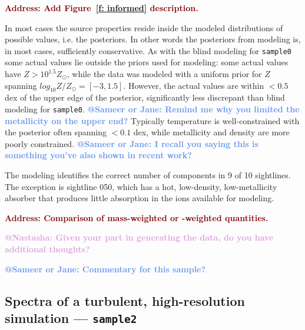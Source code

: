 \documentclass[fleqn,usenatbib]{mnras}
\makeatletter
\newcommand{\todo}[1]{\textcolor{Maroon}{\textbf{Address: #1}}}
\newcommand{\atsameer}[1]{\textcolor{CornflowerBlue}{\textbf{@Sameer or Jane: #1}}}
\newcommand{\atnastasha}[1]{\textcolor{Plum}{\textbf{@Nastasha: #1}}}
\makeatother
\begin{document}
\todo{Add Figure~\ref{f: informed} description.}

In most cases the source properties reside inside the modeled distributions of possible values, i.e. the posteriors.
In other words the posteriors from modeling is, in most cases, sufficiently conservative.
As with the blind modeling for \texttt{sample0} some actual values lie outside the priors used for modeling: some actual values have $Z > 10^{1.5} Z_\odot$, while the data was modeled with a uniform prior for $Z$ spanning $log_{10} Z/Z_\odot = [-3, 1.5]$.
However, the actual values are within $< 0.5$ dex of the upper edge of the posterior, significantly less discrepant than blind modeling for \texttt{sample0}.
\atsameer{Remind me why you limited the metallicity on the upper end?}
Typically temperature is well-constrained with the posterior often spanning $<0.1$ dex, while metallicity and density are more poorly constrained.
\atsameer{I recall you saying this is something you've also shown in recent work?}

The modeling identifies the correct number of components in 9 of 10 sightlines.
The exception is sightline 050, which has a hot, low-density, low-metallicity absorber that produces little absorption in the ions available for modeling.

\todo{Comparison of mass-weighted or -weighted quantities.}

\atnastasha{Given your part in generating the data, do you have additional thoughts?}

\atsameer{Commentary for this sample?}

\subsection{Spectra of a turbulent, high-resolution simulation --- \texttt{sample2}}
\label{s: results -- sample2}
\end{document}
